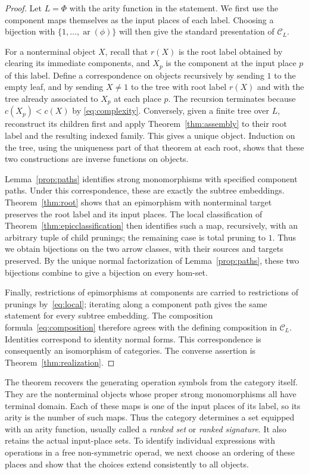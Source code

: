 \documentclass[11pt,a4paper]{article}
\theoremstyle{plain}
\theoremstyle{definition}
\theoremstyle{remark}
\newcommand{\C}{\mathcal C}
\newcommand{\one}{1}
\begin{document}
\begin{proof}
Let $L=\Phi$ with the arity function in the statement. We first
use the component maps themselves as the input places of each label.
Choosing a bijection with $\{1,\ldots,\operatorname{ar}(\phi)\}$
will then give the standard presentation of $\C_L$.

For a nonterminal object $X$, recall that $r(X)$ is the root label
obtained by clearing its immediate components, and $X_p$ is the
component at the input place $p$ of this label. Define a correspondence
on objects recursively by sending $\one$ to the
empty leaf, and by sending $X\ne\one$ to the tree with root
label $r(X)$ and with the tree already associated to $X_p$ at each place $p$.
The recursion terminates because $c(X_p)<c(X)$ by
\eqref{eq:complexity}. Conversely, given a finite tree over $L$,
reconstruct its children first and apply Theorem~\ref{thm:assembly}
to their root label and the resulting indexed family. This gives a
unique object. Induction on the tree, using the uniqueness part of
that theorem at each root, shows that these two constructions
are inverse functions on objects.

Lemma~\ref{prop:paths} identifies strong monomorphisms with
specified component paths. Under this correspondence, these are
exactly the subtree embeddings. Theorem~\ref{thm:root} shows that
an epimorphism with nonterminal target preserves the root label and
its input places. The local classification of
Theorem~\ref{thm:epicclassification} then identifies such a map,
recursively, with an arbitrary tuple of child prunings; the remaining
case is total pruning to $\one$. Thus we obtain bijections
on the two arrow classes, with their sources and targets preserved.
By the unique normal factorization of Lemma~\ref{prop:paths},
these two bijections combine to give a bijection on every hom-set.

Finally, restrictions of epimorphisms at components are carried to
restrictions of prunings by~\eqref{eq:local}; iterating along a
component path gives the same statement for every subtree embedding.
The composition formula~\eqref{eq:composition} therefore agrees
with the defining composition in $\C_L$. Identities correspond to
identity normal forms. This correspondence is consequently an isomorphism
of categories. The converse assertion is Theorem~\ref{thm:realization}.
\end{proof}


The theorem recovers the generating operation symbols from the
category itself. They are the nonterminal objects whose proper
strong monomorphisms all have terminal domain. Each of these maps
is one of the input places of its label, so its arity is the number
of such maps. Thus the category determines a set equipped with
an arity function, usually called a \emph{ranked set} or
\emph{ranked signature}. It also retains the actual input-place
sets. To identify individual expressions with operations in a
free non-symmetric operad, we next choose an ordering of these
places and show that the choices extend consistently to all objects.
\end{document}
